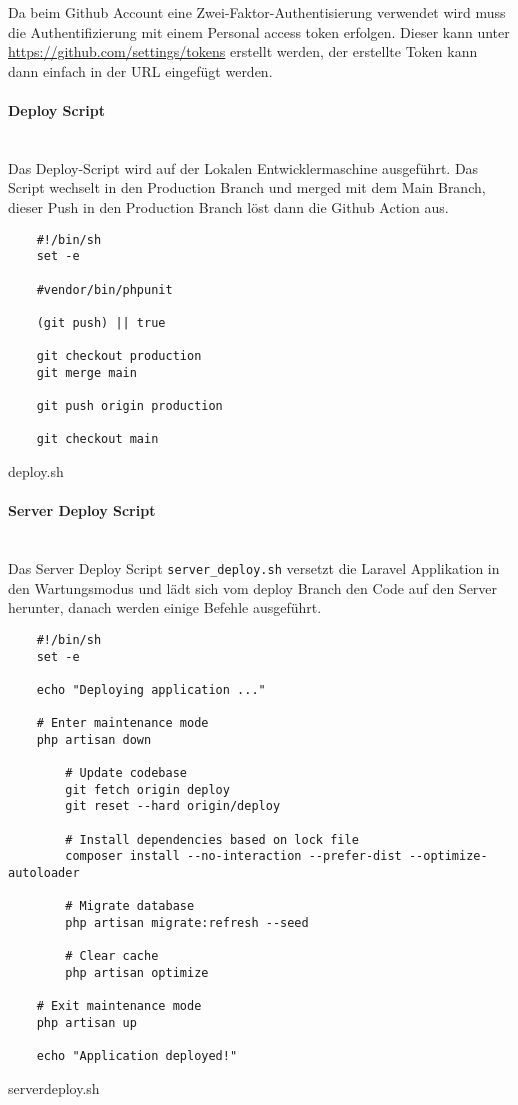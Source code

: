 Da beim Github Account eine Zwei-Faktor-Authentisierung verwendet wird muss die
Authentifizierung mit einem Personal access token erfolgen. Dieser kann unter
\url{https://github.com/settings/tokens} erstellt werden, der erstellte Token
kann dann einfach in der URL eingefügt werden.

\paragraph{Deploy Script}\mbox{}\\

Das Deploy-Script wird auf der Lokalen Entwicklermaschine ausgeführt. Das Script wechselt in den Production Branch und merged mit dem Main Branch, dieser Push in den Production Branch löst dann die Github Action aus.

\begin{listing}[H]
  \begin{verbatim}
    #!/bin/sh
    set -e
    
    #vendor/bin/phpunit
    
    (git push) || true
    
    git checkout production
    git merge main
    
    git push origin production
    
    git checkout main
  \end{verbatim}
  \caption{deploy.sh}
\end{listing}

\paragraph{Server Deploy Script}\mbox{}\\

Das Server Deploy Script \verb|server_deploy.sh| versetzt die Laravel Applikation in den Wartungsmodus und lädt sich vom deploy Branch den Code auf den Server herunter, danach werden einige Befehle ausgeführt.

\begin{longlisting}
  \begin{verbatim}
    #!/bin/sh
    set -e
    
    echo "Deploying application ..."
    
    # Enter maintenance mode
    php artisan down
        
        # Update codebase
        git fetch origin deploy
        git reset --hard origin/deploy
    
        # Install dependencies based on lock file
        composer install --no-interaction --prefer-dist --optimize-autoloader
    
        # Migrate database
        php artisan migrate:refresh --seed
    
        # Clear cache
        php artisan optimize
    
    # Exit maintenance mode
    php artisan up
    
    echo "Application deployed!"
  \end{verbatim}
  \caption{serverdeploy.sh}
\end{longlisting}



